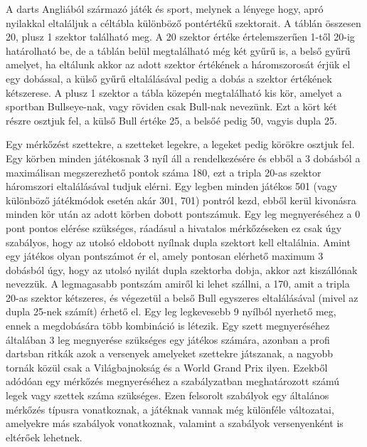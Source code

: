 

A darts Angliából származó játék és sport, melynek a lényege hogy, apró nyilakkal eltaláljuk a céltábla különböző pontértékű szektorait. A táblán összesen 20, plusz 1 szektor található meg. A 20 szektor értéke értelemszerűen 1-től 20-ig határolható be, de a táblán belül megtalálható még két gyűrű is, a belső gyűrű amelyet, ha eltálunk akkor az adott szektor értékének a háromszorosát érjük el egy dobással, a külső gyűrű eltalálásával pedig a dobás a szektor értékének kétszerese. A plusz 1 szektor a tábla közepén megtalálható kis kör, amelyet a sportban Bullseye-nak, vagy röviden csak Bull-nak nevezünk. Ezt a kört két részre osztjuk fel, a külső Bull értéke 25, a belsőé pedig 50, vagyis dupla 25. \cite{Darts1}\newline
 
Egy mérkőzést szettekre, a szetteket legekre, a legeket pedig körökre osztjuk fel. Egy körben minden játékosnak 3 nyíl áll a rendelkezésére és ebből a 3 dobásból a maximálisan megszerezhető pontok száma 180, ezt a tripla 20-as szektor háromszori eltalálásával tudjuk elérni. Egy legben minden játékos 501 (vagy különböző játékmódok esetén akár 301, 701) pontról kezd, ebből kerül kivonásra minden kör után az adott körben dobott pontszámuk. Egy leg megnyeréséhez a 0 pont pontos elérése szükséges, ráadásul a hivatalos mérkőzéseken ez csak úgy szabályos, hogy az utolsó eldobott nyílnak dupla szektort kell eltalálnia. Amint egy játékos olyan pontszámot ér el, amely pontosan elérhető maximum 3 dobásból úgy, hogy az utolsó nyilát dupla szektorba dobja, akkor azt kiszállónak nevezzük. A legmagasabb pontszám amiről ki lehet szállni, a 170, amit a tripla 20-as szektor kétszeres, és végezetül a belső Bull egyszeres eltalálásával (mivel az dupla 25-nek számít) érhető el. Egy leg legkevesebb 9 nyílból nyerhető meg, ennek a megdobására több kombináció is létezik. Egy szett megnyeréséhez általában 3 leg megnyerése szükséges egy játékos számára, azonban a profi dartsban ritkák azok a versenyek amelyeket szettekre játszanak, a nagyobb tornák közül csak a Világbajnokság és a World Grand Prix ilyen. Ezekből adódóan egy mérkőzés megnyeréséhez a szabályzatban meghatározott számú legek vagy szettek száma szükséges. Ezen felsorolt szabályok egy általános mérkőzés típusra vonatkoznak, a játéknak vannak még különféle változatai, amelyekre más szabályok vonatkoznak, valamint a szabályok versenyenként is eltérőek lehetnek.


